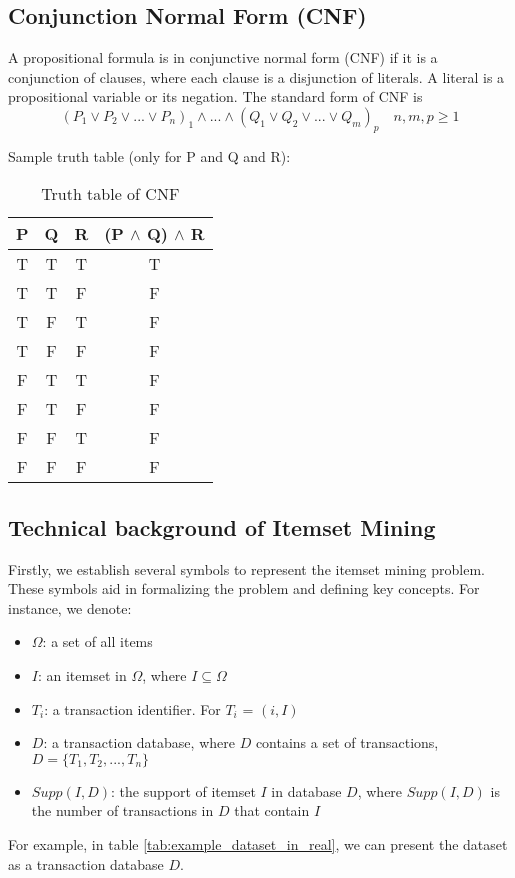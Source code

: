 \subsection{Conjunction Normal Form (CNF)}

A propositional formula is in conjunctive normal form (CNF) if it is a conjunction of clauses, where each clause is a disjunction of literals. A literal is a propositional variable or its negation.
The standard form of CNF is
\begin{equation*}
    (P_1 \lor P_2 \lor ... \lor P_n)_1 \land ... \land (Q_1 \lor Q_2 \lor ... \lor Q_m)_p \quad n,m,p \geq 1
\end{equation*}

Sample truth table (only for P and Q and R):
\begin{table}[H]
    \centering
    \begin{tabular}{|c|c|c|c|}
        \hline
        P & Q & R & (P $\land$ Q) $\land$ R \\
        \hline
        T & T & T & T                       \\
        T & T & F & F                       \\
        T & F & T & F                       \\
        T & F & F & F                       \\
        F & T & T & F                       \\
        F & T & F & F                       \\
        F & F & T & F                       \\
        F & F & F & F                       \\
        \hline
    \end{tabular}
    \caption{Truth table of CNF}
    \label{tab:truth_table_cnf}
\end{table}

\subsection{Technical background of Itemset Mining}
Firstly, we establish several symbols to represent the itemset mining problem.
These symbols aid in formalizing the problem and defining key concepts.
For instance, we denote:
\begin{itemize}
    \item \textbf{$\Omega$}: a set of all items
    \item \textbf{$I$}: an itemset in $\Omega$, where $I \subseteq \Omega$
    \item \textbf{$T_i$}: a transaction identifier. For $T_i$ = $(i,I)$
    \item \textbf{$D$}: a transaction database, where $D$ contains a set of transactions, $D = \{T_1, T_2, ..., T_n\}$
    \item \textbf{$Supp(I, D)$}: the support of itemset $I$ in database $D$, where $Supp(I, D)$ is the number of transactions in $D$ that contain $I$
\end{itemize}
For example, in table \ref{tab:example_dataset_in_real},
we can present the dataset as a transaction database $D$.

